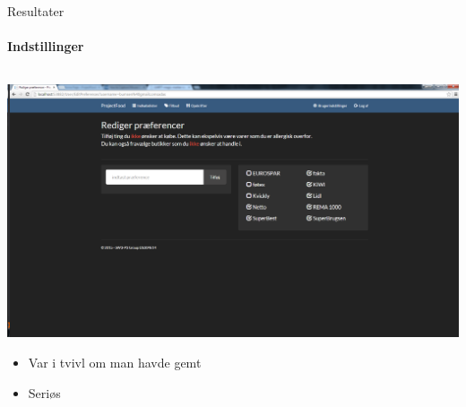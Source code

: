 \begin{frame}{Resultater}
\framesubtitle{Indstillinger}


	
	\begin{minipage}[0.3\textheight]{\textwidth}
	\begin{columns}[T]
	\begin{column}{1\textwidth}
	\vspace{-15 pt}
	 \includegraphics[width=1\textwidth,height=1\textheight,keepaspectratio, trim={1cm 0 0 16mm}, clip]{images/Screenshots/SettingsOld2.png}
	 
	 \begin{itemize}
	 	 	\item Var i tvivl om man havde gemt
	 	 	\item Seriøs
	 \end{itemize}
	
	\end{column}

	\end{columns}

  \end{minipage}
	
\end{frame}

